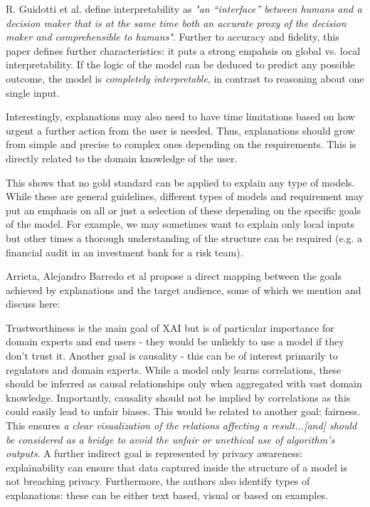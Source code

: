 \documentclass[proposal]{softeng}
\begin{document}
R. Guidotti et al. \cite{guidotti} define interpretability as \textit{"an “interface” between humans and a decision maker that is at the same time both an accurate proxy of the decision maker and comprehensible to humans"}. Further to accuracy and fidelity, this paper defines further characteristics: it puts a strong empahsis on global vs. local interpretability. If the logic of the model can be deduced to predict any possible outcome, the model is \textit{completely interpretable}, in contrast to reasoning about one single input. 

Interestingly, explanations may also need to have time limitations based on how urgent a further action from the user is needed. Thus, explanations should grow from simple and precise to complex ones depending on the requirements. This is directly related to the domain knowledge of the user.

This shows that no gold standard can be applied to explain any type of models. While these are general guidelines, different types of models and requirement may put an emphasis on all or just a selection of these depending on the specific goals of the model. For example, we may sometimes want to explain only local inputs but other times a thorough understanding of the structure can be required (e.g. a financial audit in an investment bank for a risk team). 

Arrieta, Alejandro Barredo et al\cite{BarredoArrietaAlejandro2020EAIX} propose a direct mapping between the goals achieved by explanations and the target audience, some of which we mention and discuss here:

Trustworthiness is the main goal of XAI but is of particular importance for domain experts and end users - they would be unliekly to use a model if they don't trust it. Another goal is causality - this can be of interest primarily to regulators and domain experts. While a model only learns correlations, these should be inferred as causal relationships only when aggregated with vast domain knowledge. Importantly, causality should not be implied by correlations as this could easily lead to unfair biases. This would be related to another goal: fairness. This ensures \textit{a clear visualization of the relations affecting a result...[and] should be considered as a bridge to avoid the unfair or unethical use of algorithm’s outputs}. A further indirect goal is represented by privacy awareness: explainability can ensure that data captured inside the structure of a model is not breaching privacy. Furthermore, the authors also identify types of explanations: these can be either text based, visual or based on examples.
\end{document}
